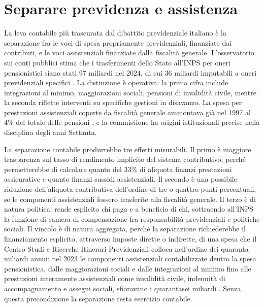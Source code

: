\section{Separare previdenza e assistenza}
\label{sec:separazione}

\noindent
La leva contabile più trascurata dal dibattito previdenziale italiano è la
separazione fra le voci di spesa propriamente previdenziali, finanziate dai
contributi, e le voci assistenziali finanziate dalla fiscalità generale.
L'osservatorio sui conti pubblici stima che i trasferimenti dello Stato
all'INPS per oneri pensionistici siano stati 97 miliardi nel 2024, di cui
36 miliardi imputabili a oneri previdenziali specifici \cite{OCPI2026}. La
distinzione è operativa: la prima cifra include integrazioni al minimo,
maggiorazioni sociali, pensioni di invalidità civile, mentre la seconda
riflette interventi su specifiche gestioni in disavanzo. La spesa per
prestazioni assistenziali coperte da fiscalità generale ammontava già nel
1997 al 4\% del totale delle pensioni \cite{Milazzo1999}, e la commistione
ha origini istituzionali precise nella disciplina degli anni Settanta.

\medskip
\noindent
La separazione contabile produrrebbe tre effetti misurabili. Il primo è
maggiore trasparenza sul tasso di rendimento implicito del sistema
contributivo, perché permetterebbe di calcolare quanto del 33\% di aliquota
finanzi prestazioni assicurative e quanto finanzi sussidi assistenziali. Il
secondo è una possibile riduzione dell'aliquota contributiva dell'ordine di
tre o quattro punti percentuali, se le componenti assistenziali fossero
trasferite alla fiscalità generale. Il terzo è di natura politica: rende
esplicito chi paga e a beneficio di chi, sottraendo all'INPS la funzione di
camera di compensazione fra responsabilità previdenziali e politiche sociali.
Il vincolo è di natura aggregata, perché la separazione richiederebbe il
finanziamento esplicito, attraverso imposte dirette o indirette, di una spesa
che il Centro Studi e Ricerche Itinerari Previdenziali colloca nell'ordine dei
quaranta miliardi annui: nel 2023 le componenti assistenziali contabilizzate
dentro la spesa pensionistica, dalle maggiorazioni sociali e dalle integrazioni
al minimo fino alle prestazioni interamente assistenziali come invalidità civile,
indennità di accompagnamento e assegni sociali, sfioravano i quarantasei miliardi
\cite{ItinerariPrevidenziali2024}. Senza questa precondizione la separazione
resta esercizio contabile.

